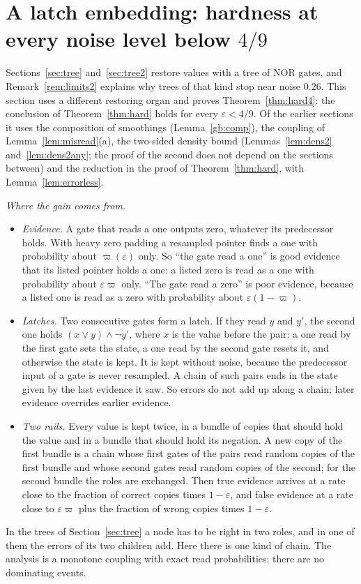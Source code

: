 \documentclass[11pt]{amsart}
\theoremstyle{definition}
\theoremstyle{remark}
\newcommand{\eps}{\varepsilon}
\begin{document}
\section{A latch embedding: hardness at every noise level below \texorpdfstring{$4/9$}{4/9}}\label{sec:latch}

Sections~\ref{sec:tree} and~\ref{sec:tree2} restore values with a tree of NOR gates, and
Remark~\ref{rem:limits2} explains why trees of that kind stop near noise $0.26$. This section uses
a different restoring organ and proves Theorem~\ref{thm:hard4}: the conclusion of
Theorem~\ref{thm:hard} holds for every $\eps<4/9$. Of the earlier sections it uses the composition
of smoothings (Lemma~\ref{gb:comp}), the coupling of Lemma~\ref{lem:misread}(a), the two-sided
density bound (Lemmas~\ref{lem:dens2} and~\ref{lem:dens2any}; the proof of the second does not
depend on the sections between) and the reduction in the proof of Theorem~\ref{thm:hard}, with
Lemma~\ref{lem:errorless}.

\emph{Where the gain comes from.}
\begin{itemize}[leftmargin=2em]
\item \emph{Evidence.} A gate that reads a one outputs zero, whatever its predecessor holds. With
heavy zero padding a resampled pointer finds a one with probability about $\varpi(\eps)$ only. So
``the gate read a one'' is good evidence that its listed pointer holds a one: a listed zero is
read as a one with probability about $\eps\varpi$ only. ``The gate read a zero'' is poor evidence,
because a listed one is read as a zero with probability about $\eps(1-\varpi)$.
\item \emph{Latches.} Two consecutive gates form a latch. If they read $y$ and $y'$, the second
one holds $(x\vee y)\wedge\neg y'$, where $x$ is the value before the pair: a one read by the
first gate sets the state, a one read by the second gate resets it, and otherwise the state is
kept. It is kept without noise, because the predecessor input of a gate is never resampled. A
chain of such pairs ends in the state given by the last evidence it saw. So errors do not add up
along a chain; later evidence overrides earlier evidence.
\item \emph{Two rails.} Every value is kept twice, in a bundle of copies that should hold the
value and in a bundle that should hold its negation. A new copy of the first bundle is a chain
whose first gates of the pairs read random copies of the first bundle and whose second gates read
random copies of the second; for the second bundle the roles are exchanged. Then true evidence
arrives at a rate close to the fraction of correct copies times $1-\eps$, and false evidence at
a rate close to $\eps\varpi$ plus the fraction of wrong copies times $1-\eps$.
\end{itemize}
In the trees of Section~\ref{sec:tree} a node has to be right in two roles, and in one of them
the errors of its two children add. Here there is one kind of chain. The analysis is a monotone
coupling with exact read probabilities; there are no dominating events.
\end{document}
